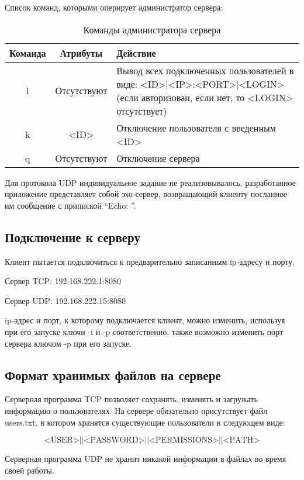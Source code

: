 Список команд, которыми оперирует администратор сервера:

\begin{table}[H]
	\centering
	\begin{tabular}{|c|c|M{12cm}|}
		\hline Команда               & Атрибуты   & Действие	\\
		\hline l               & Отсутствуют   & Вывод всех подключенных пользователей в виде: <ID>|<IP>:<PORT>|<LOGIN> (если авторизован, если нет, то <LOGIN> отсутствует)	\\
		\hline k               & <ID>   & Отключение пользователя с введенным <ID>	\\
		\hline q               & Отсутствуют   & Отключение сервера	\\ \hline
	\end{tabular}
	\caption{Команды администратора сервера}
	\label{tab:tcp_after}
\end{table}

Для протокола UDP индивидуальное задание не реализовывалось, разработанное приложение представляет собой эхо-сервер, возвращающий клиенту посланное им сообщение с припиской ``Echo: ''.

\subsection{Подключение к серверу}

Клиент пытается подключиться к предварительно записанным ip-адресу и порту.

Сервер TCP: 192.168.222.1:8080

Сервер UDP: 192.168.222.15:8080

ip-адрес и порт, к которому подключается клиент, можно изменить, используя при его запуске ключи -i и -p соответственно, также возможно изменить порт сервера ключом -p при его запуске.

\subsection{Формат хранимых файлов на сервере}

Серверная программа TCP позволяет сохранять, изменять и загружать информацию о пользователях. На сервере обязательно присутствует файл users.txt, в котором хранятся существующие пользователи в следующем виде:

\[\text{<USER>}||\text{<PASSWORD>}||\text{<PERMISSIONS>}||\text{<PATH>}\]

Серверная программа UDP не хранит никакой информации в файлах во время своей работы.